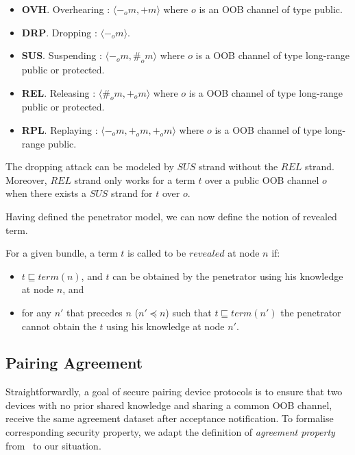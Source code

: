 \begin{itemize}
\item \textbf{OVH}. Overhearing : $\langle -_om, +m \rangle$ where $o$ is an OOB channel of type public.
\item \textbf{DRP}. Dropping : $\langle -_om \rangle$.
\item \textbf{SUS}. Suspending : $\langle -_om,\#_om \rangle$ where $o$ is a OOB channel of type long-range public or protected. 
\item \textbf{REL}. Releasing : $\langle \#_om,+_om  \rangle$ where $o$ is a OOB channel of type long-range public or protected.
\item \textbf{RPL}. Replaying : $\langle -_om,+_om,+_om  \rangle$ where $o$ is a OOB channel of type long-range public.
\end{itemize} 

The dropping attack can be modeled by $SUS$ strand without the $REL$ strand. Moreover, $REL$ strand only works for a term $t$ over a public OOB channel $o$ when there exists a $SUS$ strand for $t$ over $o$.  

Having defined the penetrator model, we can now define the notion of revealed term.

\begin{Definition}
For a given bundle, a term $t$ is called to be $revealed$ at node $n$ if:
\begin{itemize}
    \item $t \sqsubseteq term(n)$, and $t$ can be obtained by the penetrator using his knowledge at node $n$, and
    \item for any $n'$ that precedes $n$ ($n' \preceq n$) such that $t \sqsubseteq term(n')$ the penetrator cannot obtain the $t$ using his knowledge at node $n'$. 
\end{itemize} 
\end{Definition}

\subsection{Pairing Agreement}

Straightforwardly, a goal of secure pairing device protocols is to ensure that two devices with no prior shared knowledge and sharing a common OOB channel, receive the same agreement dataset after acceptance notification. To formalise corresponding security property, we adapt the definition of \textit{agreement property} from~\cite{596782} to our situation.

